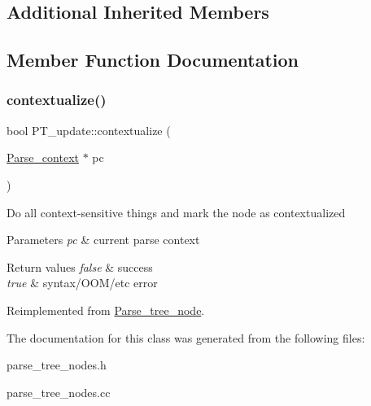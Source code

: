 \subsection*{Additional Inherited Members}


\subsection{Member Function Documentation}
\mbox{\label{classPT__update_a899ec562dc237115c862feb157f75d8e}} 
\subsubsection{\texorpdfstring{contextualize()}{contextualize()}}
{\footnotesize\ttfamily bool P\+T\+\_\+update\+::contextualize (\begin{DoxyParamCaption}\item[{\mbox{\hyperlink{structParse__context}{Parse\+\_\+context}} $\ast$}]{pc }\end{DoxyParamCaption})\hspace{0.3cm}{\ttfamily [virtual]}}

Do all context-\/sensitive things and mark the node as contextualized


\begin{DoxyParams}{Parameters}
{\em pc} & current parse context\\
\hline
\end{DoxyParams}

\begin{DoxyRetVals}{Return values}
{\em false} & success \\
\hline
{\em true} & syntax/\+O\+O\+M/etc error \\
\hline
\end{DoxyRetVals}


Reimplemented from \mbox{\hyperlink{classParse__tree__node_a22d93524a537d0df652d7efa144f23da}{Parse\+\_\+tree\+\_\+node}}.



The documentation for this class was generated from the following files\+:\begin{DoxyCompactItemize}
\item 
parse\+\_\+tree\+\_\+nodes.\+h\item 
parse\+\_\+tree\+\_\+nodes.\+cc\end{DoxyCompactItemize}

